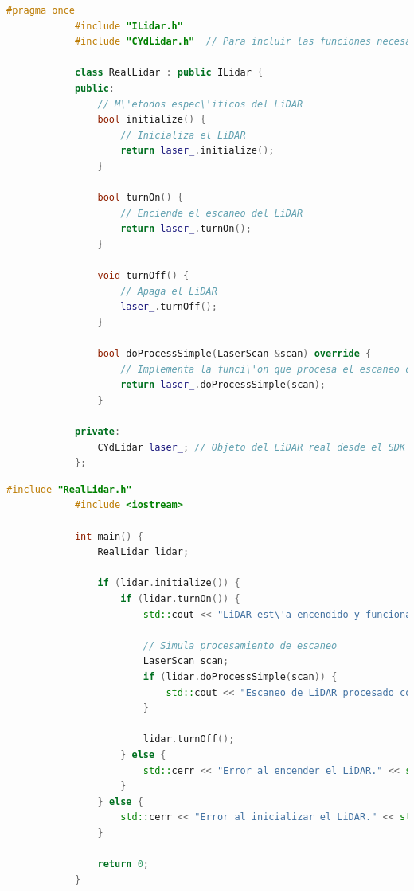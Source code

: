         \begin{lstlisting}[language={C++}, caption={RealLidar.h}, label={RealLidar.h}]
            #pragma once
            #include "ILidar.h"
            #include "CYdLidar.h"  // Para incluir las funciones necesarias como initialize, turnOn, turnOff

            class RealLidar : public ILidar {
            public:
                // M\'etodos espec\'ificos del LiDAR
                bool initialize() {
                    // Inicializa el LiDAR
                    return laser_.initialize();
                }

                bool turnOn() {
                    // Enciende el escaneo del LiDAR
                    return laser_.turnOn();
                }

                void turnOff() {
                    // Apaga el LiDAR
                    laser_.turnOff();
                }

                bool doProcessSimple(LaserScan &scan) override {
                    // Implementa la funci\'on que procesa el escaneo de LiDAR
                    return laser_.doProcessSimple(scan);
                }

            private:
                CYdLidar laser_; // Objeto del LiDAR real desde el SDK
            };
        \end{lstlisting}
        \begin{lstlisting}[language={C++}, caption={main.cpp}, label={main.cpp}]
            #include "RealLidar.h"
            #include <iostream>

            int main() {
                RealLidar lidar;

                if (lidar.initialize()) {
                    if (lidar.turnOn()) {
                        std::cout << "LiDAR est\'a encendido y funcionando." << std::endl;

                        // Simula procesamiento de escaneo
                        LaserScan scan;
                        if (lidar.doProcessSimple(scan)) {
                            std::cout << "Escaneo de LiDAR procesado correctamente." << std::endl;
                        }

                        lidar.turnOff();
                    } else {
                        std::cerr << "Error al encender el LiDAR." << std::endl;
                    }
                } else {
                    std::cerr << "Error al inicializar el LiDAR." << std::endl;
                }

                return 0;
            }
        \end{lstlisting}
